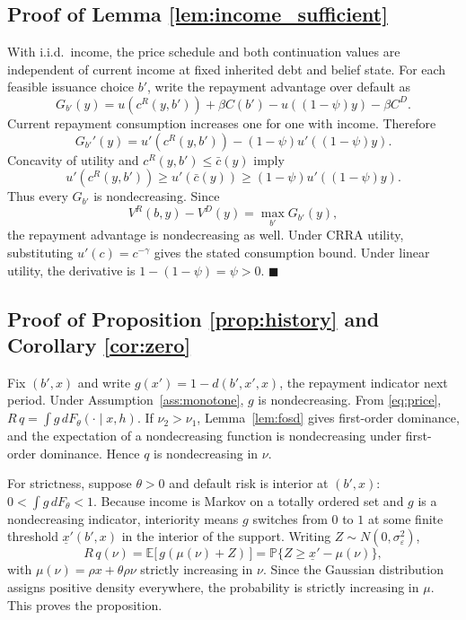 \documentclass[11pt]{article}
\theoremstyle{definition}
\newcommand{\E}{\mathbb{E}}
\newcommand{\Prob}{\mathbb{P}}
\begin{document}
\subsection{Proof of Lemma \ref{lem:income_sufficient}}
With i.i.d.\ income, the price schedule and both continuation values are independent of current income at fixed inherited debt and belief state. For each feasible issuance choice $b'$, write the repayment advantage over default as
\[
G_{b'}(y)
=u\!\left(c^R(y,b')\right)+\beta C(b')
-u\!\left((1-\psi)y\right)-\beta C^D.
\]
Current repayment consumption increases one for one with income. Therefore
\[
G_{b'}'(y)
=u'\!\left(c^R(y,b')\right)
-(1-\psi)u'\!\left((1-\psi)y\right).
\]
Concavity of utility and $c^R(y,b')\leq \bar c(y)$ imply
\[
u'\!\left(c^R(y,b')\right)
\geq u'\!\left(\bar c(y)\right)
\geq (1-\psi)u'\!\left((1-\psi)y\right).
\]
Thus every $G_{b'}$ is nondecreasing. Since
\[
V^R(b,y)-V^D(y)=\max_{b'}G_{b'}(y),
\]
the repayment advantage is nondecreasing as well. Under CRRA utility, substituting $u'(c)=c^{-\gamma}$ gives the stated consumption bound. Under linear utility, the derivative is $1-(1-\psi)=\psi>0$. $\blacksquare$

\subsection{Proof of Proposition \ref{prop:history} and Corollary \ref{cor:zero}}
Fix $(b', x)$ and write $g(x') = 1 - d(b', x', x)$, the repayment indicator next period. Under Assumption~\ref{ass:monotone}, $g$ is nondecreasing. From \eqref{eq:price}, $R\, q = \int g \, dF_\theta(\cdot \mid x, h)$. If $\nu_2 > \nu_1$, Lemma~\ref{lem:fosd} gives first-order dominance, and the expectation of a nondecreasing function is nondecreasing under first-order dominance. Hence $q$ is nondecreasing in $\nu$.

For strictness, suppose $\theta > 0$ and default risk is interior at $(b', x)$: $0 < \int g\, dF_\theta < 1$. Because income is Markov on a totally ordered set and $g$ is a nondecreasing indicator, interiority means $g$ switches from $0$ to $1$ at some finite threshold $\underline{x}'(b', x)$ in the interior of the support. Writing $Z \sim N(0, \sigma_\varepsilon^2)$,
\[
R\,q(\nu) = \E\big[\, g(\mu(\nu) + Z) \,\big] = \Prob\{ Z \ge \underline{x}' - \mu(\nu) \},
\]
with $\mu(\nu) = \rho x + \theta\rho \nu$ strictly increasing in $\nu$. Since the Gaussian distribution assigns positive density everywhere, the probability is strictly increasing in $\mu$. This proves the proposition.
\end{document}
